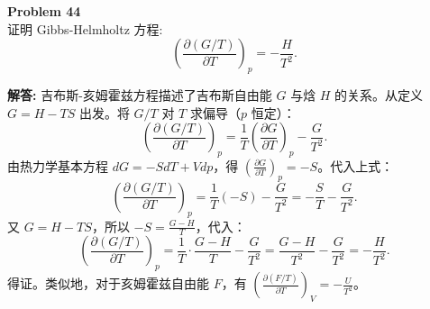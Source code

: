 \documentclass[12pt, a4paper, oneside]{ctexart}
\newenvironment{solution}{\par\noindent\textbf{解答:}\quad}{\par}
\begin{document}
\begin{mdframed}[backgroundcolor=gray!10, linewidth=0pt]
    \textbf{Problem 44} \\
    证明 Gibbs-Helmholtz 方程:
    \[
    \left(\frac{\partial (G/T)}{\partial T}\right)_p = -\frac{H}{T^2}.
    \]
\end{mdframed}
\begin{solution}
    吉布斯-亥姆霍兹方程描述了吉布斯自由能 $G$ 与焓 $H$ 的关系。从定义 $G = H - TS$ 出发。将 $G/T$ 对 $T$ 求偏导（$p$ 恒定）：
    \[
    \left(\frac{\partial (G/T)}{\partial T}\right)_p = \frac{1}{T} \left(\frac{\partial G}{\partial T}\right)_p - \frac{G}{T^2}.
    \]
    由热力学基本方程 $dG = -S dT + V dp$，得 $\left(\frac{\partial G}{\partial T}\right)_p = -S$。代入上式：
    \[
    \left(\frac{\partial (G/T)}{\partial T}\right)_p = \frac{1}{T} (-S) - \frac{G}{T^2} = -\frac{S}{T} - \frac{G}{T^2}.
    \]
    又 $G = H - TS$，所以 $-S = \frac{G-H}{T}$，代入：
    \[
    \left(\frac{\partial (G/T)}{\partial T}\right)_p = \frac{1}{T} \cdot \frac{G-H}{T} - \frac{G}{T^2} = \frac{G-H}{T^2} - \frac{G}{T^2} = -\frac{H}{T^2}.
    \]
    得证。类似地，对于亥姆霍兹自由能 $F$，有 $\left(\frac{\partial (F/T)}{\partial T}\right)_V = -\frac{U}{T^2}$。
\end{solution}
\end{document}
